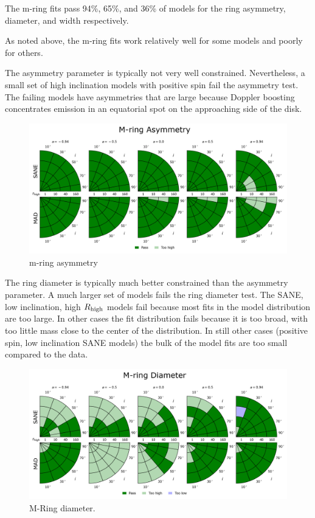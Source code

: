 
The m-ring fits pass 94\%, 65\%, and 36\% of models for the ring asymmetry, diameter, and width respectively.

As noted above, the m-ring fits work relatively well for some models and poorly for others.

The asymmetry parameter is typically not very well constrained.  Nevertheless, a small set of high inclination models with positive spin fail the asymmetry test.  The failing models have asymmetries that are large because Doppler boosting concentrates emission in an equatorial spot on the approaching side of the disk.

\begin{figure}
  \centering
  \includegraphics[width=\columnwidth]{./figures/Mring_f1_Constraints.png}
  \caption{m-ring asymmetry}
  \label{fig:cmp_m-ring_asymm}
\end{figure}

The ring diameter is typically much better constrained than the asymmetry parameter.
A much larger set of models fails the ring diameter test.
The SANE, low inclination, high $R_\mathrm{high}$ models fail because most fits in the model distribution are too large.  In other cases the fit distribution fails because it is too broad, with too little mass close to the center of the distribution.  In still other cases (positive spin, low inclination SANE models) the bulk of the model fits are too small compared to the data.

\begin{figure}
  \centering
  \includegraphics[width=\columnwidth]{./figures/Mring_d_Constraints.png}
  \caption{M-Ring diameter.}
  \label{fig:cmp_m-ring_diam}
\end{figure}

